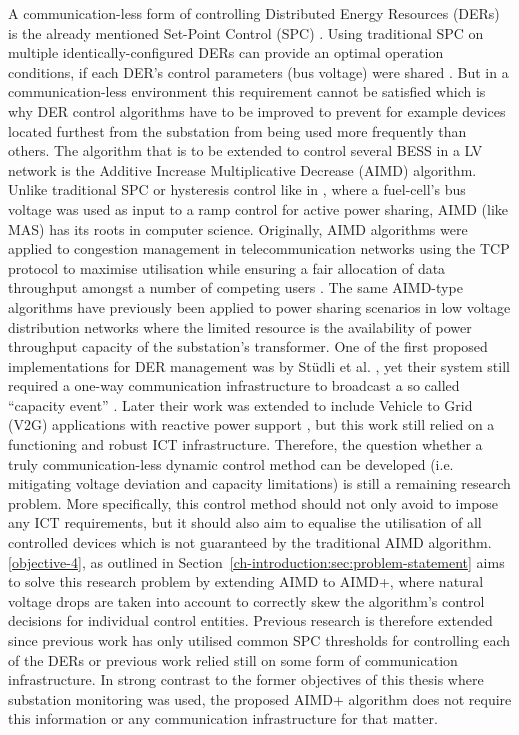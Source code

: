 A communication-less form of controlling Distributed Energy Resources (DERs) is the already mentioned Set-Point Control (SPC) \cite{Leadbetter2012}.
Using traditional SPC on multiple identically-configured DERs can provide an optimal operation conditions, if each DER's control parameters (bus voltage) were shared \cite{Thieblemont2017a}.
But in a communication-less environment this requirement cannot be satisfied which is why DER control algorithms have to be improved to prevent for example devices located furthest from the substation from being used more frequently than others.
The algorithm that is to be extended to control several BESS in a LV network is the Additive Increase Multiplicative Decrease (AIMD) algorithm.
Unlike traditional SPC or hysteresis control like in \cite{Jiang2007}, where a fuel-cell's bus voltage was used as input to a ramp control for active power sharing, AIMD (like MAS) has its roots in computer science.
Originally, AIMD algorithms were applied to congestion management in telecommunication networks using the TCP protocol \cite{Chiu1989} to maximise utilisation while ensuring a fair allocation of data throughput amongst a number of competing users \cite{Wirth2014}.
The same AIMD-type algorithms have previously been applied to power sharing scenarios in low voltage distribution networks where the limited resource is the availability of power throughput capacity of the substation's transformer.
One of the first proposed implementations for DER management was by St{\"{u}}dli et al. \cite{Studli2012}, yet their system still required a one-way communication infrastructure to broadcast a so called ``capacity event'' \cite{Studli2014, Studli2014a}.
Later their work was extended to include Vehicle to Grid (V2G) applications with reactive power support \cite {Studli2015}, but this work still relied on a functioning and robust ICT infrastructure.
Therefore, the question whether a truly communication-less dynamic control method can be developed (i.e. mitigating voltage deviation and capacity limitations) is still a remaining research problem.
More specifically, this control method should not only avoid to impose any ICT requirements, but it should also aim to equalise the utilisation of all controlled devices which is not guaranteed by the traditional AIMD algorithm.
\ref{objective-4}, as outlined in Section~\ref{ch-introduction:sec:problem-statement} aims to solve this research problem by extending AIMD to AIMD+, where natural voltage drops are taken into account to correctly skew the algorithm's control decisions for individual control entities.
Previous research is therefore extended since previous work has only utilised common SPC thresholds for controlling each of the DERs or previous work relied still on some form of communication infrastructure.
In strong contrast to the former objectives of this thesis where substation monitoring was used, the proposed AIMD+ algorithm does not require this information or any communication infrastructure for that matter.
